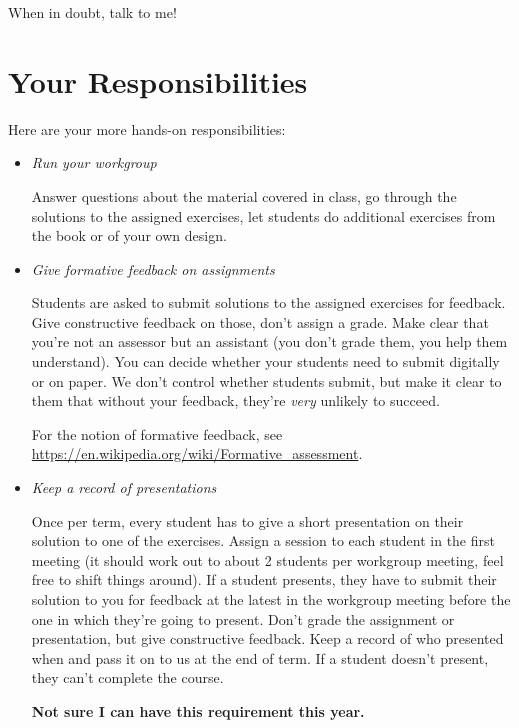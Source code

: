 When in doubt, talk to me!

\section*{Your Responsibilities}

Here are your more hands-on responsibilities:

	\begin{itemize}
	
		\item \emph{Run your workgroup}
		
		Answer questions about the material covered in class,
		go through the solutions to the assigned exercises,
		let students do additional exercises from the book or of your own design.
		
		\item \emph{Give formative feedback on assignments}
		
		Students are asked to submit solutions to the assigned exercises for feedback.
		Give constructive feedback on those, don't assign a grade.
		Make clear that you're not an assessor but an assistant (you don't grade them, you help them understand).
		You can decide whether your students need to submit digitally or on paper.
		We don't control whether students submit, but make it clear to them that without your feedback, they're \emph{very} unlikely to succeed.
		
		For the notion of formative feedback, see \url{https://en.wikipedia.org/wiki/Formative_assessment}.
		
		\item \emph{Keep a record of presentations}
		
		Once per term, every student has to give a short presentation on their solution to one of the exercises. Assign a session to each student in the first meeting (it should work out to about 2 students per workgroup meeting, feel free to shift things around). If a student presents, they have to submit their solution to you for feedback at the latest in the workgroup meeting before the one in which they're going to present. Don't grade the assignment or presentation, but give constructive feedback. Keep a record of who presented when and pass it on to us at the end of term. If a student doesn't present, they can't complete the course.

	 	\textbf{Not sure I can have this requirement this year.}
		

\end{itemize}
